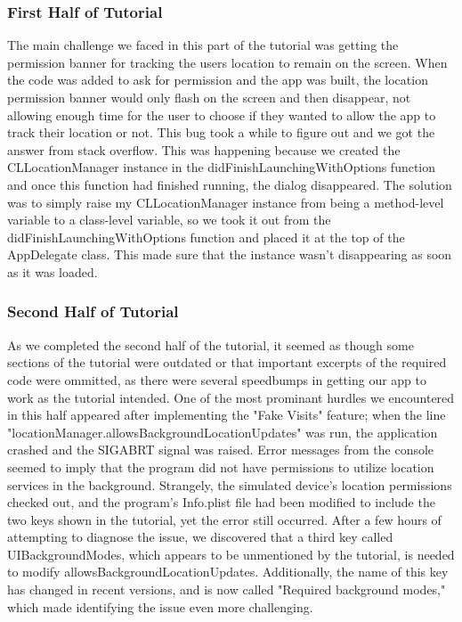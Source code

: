 \documentclass[conference]{IEEEtran}
\begin{document}
\subsubsection{First Half of Tutorial}
The main challenge we faced in this part of the tutorial was getting the permission 
banner for tracking the users location to remain on the screen. When the code was 
added to ask for permission and the app was built, the location permission banner 
would only flash on the screen and then disappear, not allowing enough time for the 
user to choose if they wanted to allow the app to track their location or not. This bug 
took a while to figure out and we got the answer from stack overflow. This was happening 
because we created the CLLocationManager instance in the didFinishLaunchingWithOptions 
function and once this function had finished running, the dialog disappeared. The solution 
was to simply raise my CLLocationManager instance from being a method-level variable to a 
class-level variable, so we took it out from the didFinishLaunchingWithOptions function and 
placed it at the top of the AppDelegate class. This made sure that the instance wasn't 
disappearing as soon as it was loaded. 

\subsubsection{Second Half of Tutorial}
As we completed the second half of the tutorial, it seemed as though some sections of the
tutorial were outdated or that important excerpts of the required code were ommitted, as
there were several speedbumps in getting our app to work as the tutorial intended. One of
the most prominant hurdles we encountered in this half appeared after implementing the 
"Fake Visits" feature; when the line "locationManager.allowsBackgroundLocationUpdates"
was run, the application crashed and the SIGABRT signal was raised. Error messages from
the console seemed to imply that the program did not have permissions to utilize location
services in the background. Strangely, the simulated device's location permissions checked
out, and the program's Info.plist file had been modified to include the two keys shown in 
the tutorial, yet the error still occurred. After a few hours of attempting to diagnose 
the issue, we discovered that a third key called UIBackgroundModes, which appears to be 
unmentioned by the tutorial, is needed to modify allowsBackgroundLocationUpdates.
Additionally, the name of this key has changed in recent versions, and is now called 
"Required background modes," which made identifying the issue even more challenging.
\end{document}
